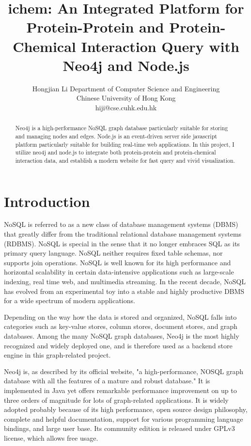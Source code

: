 \documentclass[10pt,conference,compsocconf]{../IEEEtran}
\begin{document}
\title{ichem: An Integrated Platform for Protein-Protein and Protein-Chemical Interaction Query with Neo4j and Node.js}
\author
{
\IEEEauthorblockN
{
Hongjian Li
\IEEEauthorblockA
{
Department of Computer Science and Engineering\\
Chinese University of Hong Kong\\
hiji@cse.cuhk.edu.hk
}
}
}
\maketitle

\begin{abstract}

Neo4j is a high-performance NoSQL graph database particularly suitable for storing and managing nodes and edges. Node.js is an event-driven server side javascript platform particularly suitable for building real-time web applications. In this project, I utilize neo4j and node.js to integrate both protein-protein and protein-chemical interaction data, and establish a modern website for fast query and vivid visualization.

\end{abstract}

\section{Introduction}

NoSQL is referred to as a new class of database management systems (DBMS) that greatly differ from the traditional relational database management systems (RDBMS). NoSQL is special in the sense that it no longer embraces SQL as its primary query language. NoSQL neither requires fixed table schemas, nor supports join operations. NoSQL is well known for its high performance and horizontal scalability in certain data-intensive applications such as large-scale indexing, real time web, and multimedia streaming. In the recent decade, NoSQL has evolved from an experimental toy into a stable and highly productive DBMS for a wide spectrum of modern applications.

Depending on the way how the data is stored and organized, NoSQL falls into categories such as key-value stores, column stores, document stores, and graph databases. Among the many NoSQL graph databases, Neo4j \citep{1076} is the most highly recognized and widely deployed one, and is therefore used as a backend store engine in this graph-related project.

Neo4j is, as described by its official website, "a high-performance, NOSQL graph database with all the features of a mature and robust database." It is implemented in Java yet offers remarkable performance improvement on up to three orders of magnitude for lots of graph-related applications. It is widely adopted probably because of its high performance, open source design philosophy, complete and helpful documentation, support for various programming language bindings, and large user base. Its community edition is released under GPLv3 license, which allows free usage.
\end{document}
